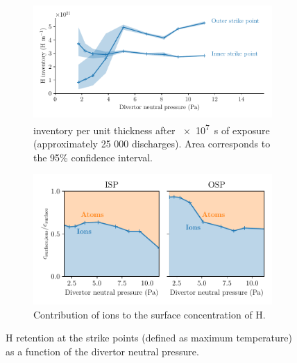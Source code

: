 \begin{figure}[h!]
    \centering
    \begin{subfigure}{\linewidth}
        \includegraphics[width=\linewidth]{Figures/Chapter4/ITER/inventory_at_strike_points.pdf}
        \caption{\Gls{inventory} per unit thickness after \SI{e7}{s} of exposure (approximately 25 000 discharges). Area corresponds to the 95\% confidence interval.}
    \end{subfigure}
    \begin{subfigure}{\linewidth}
        \includegraphics[width=\linewidth]{Figures/Chapter4/ITER/ratio_ions_atoms.pdf}
        \caption{Contribution of ions to the surface concentration of H.}
    \end{subfigure}%
    \caption{H retention at the \glspl{strike point} (defined as maximum temperature) as a function of the \gls{divertor} neutral pressure.}
\end{figure}

